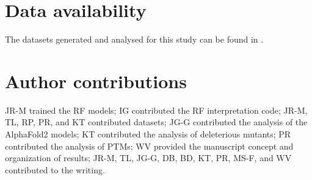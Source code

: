 
\section*{Data availability}
The datasets generated and analysed for this study can be found in .

\section*{Author contributions}

JR-M trained the RF models; IG contributed the RF interpretation code; JR-M, TL, RP, PR, and KT contributed datasets; JG-G contributed the analysis of the AlphaFold2 models; KT contributed the analysis of deleterious mutants; PR contributed the analysis of PTMs; WV provided the manuscript concept and organization of results; JR-M, TL, JG-G, DB, BD, KT, PR, MS-F, and WV contributed to the writing.